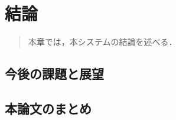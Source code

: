 \chapter{結論}
\begin{large}
\begin{quote}
本章では，本システムの結論を述べる．
\end{quote}
\end{large}
\clearpage

\section{今後の課題と展望}


\section{本論文のまとめ}
